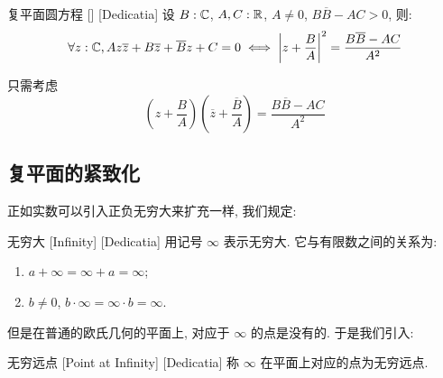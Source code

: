 
        \begin{thm}
            {复平面圆方程}
            []
            [Dedicatia]
            设 \(B:\operatorname{\mathbb{C}}\), \(A, C:\operatorname{\mathbb{R}}\), \(A\neq 0\), \(B\overline{B}-AC>0\), 则: 
            \[\forall z:\operatorname{\mathbb{C}}, Az\overline{z}+B\overline{z}+\overline{B}z+C=0\iff\left|z+\frac{B}{A}\right|^2=\frac{B\overline{B}-AC}{A^2}\]
        \end{thm}
        
        \begin{prf}
            只需考虑
            \[\left(z+\frac{B}{A}\right)\left(\overline{z}+\frac{\overline{B}}{A}\right)=\frac{B\overline{B}-AC}{A^2}\]
        \end{prf}
    
    \subsection{复平面的紧致化}

        正如实数可以引入正负无穷大来扩充一样, 我们规定: 

        \begin{dfn}
            {无穷大}
            [Infinity]
            [Dedicatia]
            用记号 \(\infty\) 表示无穷大. 它与有限数之间的关系为:
            \begin{enumerate}
                \item  \(a+\infty=\infty+a=\infty\);
                \item  \(b\neq 0\),  \(b\cdot\infty=\infty\cdot b=\infty\).
            \end{enumerate}
        \end{dfn}

        但是在普通的欧氏几何的平面上, 对应于 \(\infty\) 的点是没有的. 于是我们引入: 

        \begin{dfn}
            {无穷远点}
            [Point at Infinity]
            [Dedicatia]
            称 \(\infty\) 在平面上对应的点为无穷远点. 
        \end{dfn}

